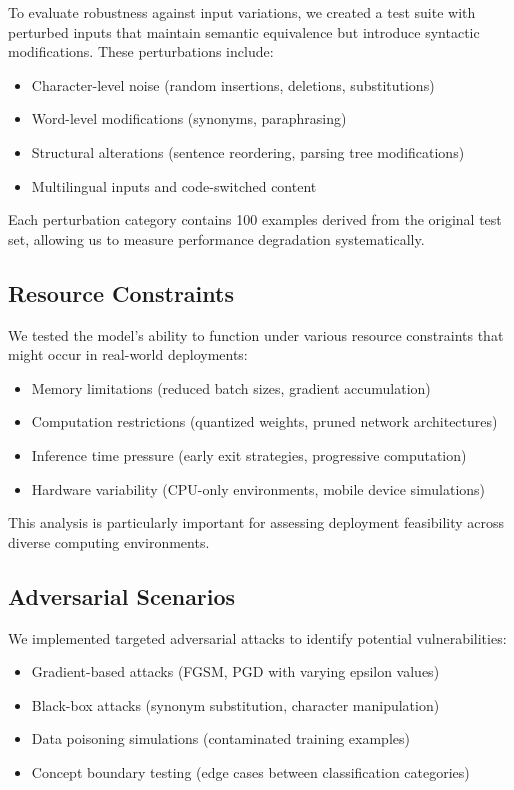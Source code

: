 \documentclass[11pt,a4paper]{article}
\begin{document}
To evaluate robustness against input variations, we created a test suite with perturbed inputs that maintain semantic equivalence but introduce syntactic modifications. These perturbations include:

\begin{itemize}
    \item Character-level noise (random insertions, deletions, substitutions)
    \item Word-level modifications (synonyms, paraphrasing)
    \item Structural alterations (sentence reordering, parsing tree modifications)
    \item Multilingual inputs and code-switched content
\end{itemize}

Each perturbation category contains 100 examples derived from the original test set, allowing us to measure performance degradation systematically.

\subsection{Resource Constraints}

We tested the model's ability to function under various resource constraints that might occur in real-world deployments:

\begin{itemize}
    \item Memory limitations (reduced batch sizes, gradient accumulation)
    \item Computation restrictions (quantized weights, pruned network architectures)
    \item Inference time pressure (early exit strategies, progressive computation)
    \item Hardware variability (CPU-only environments, mobile device simulations)
\end{itemize}

This analysis is particularly important for assessing deployment feasibility across diverse computing environments.

\subsection{Adversarial Scenarios}

We implemented targeted adversarial attacks to identify potential vulnerabilities:

\begin{itemize}
    \item Gradient-based attacks (FGSM, PGD with varying epsilon values)
    \item Black-box attacks (synonym substitution, character manipulation)
    \item Data poisoning simulations (contaminated training examples)
    \item Concept boundary testing (edge cases between classification categories)
\end{itemize}
\end{document}
